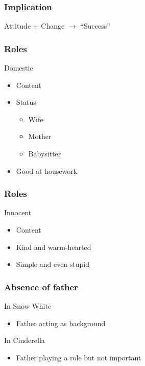 \documentclass{beamer}
\begin{document}
\begin{frame}
    \frametitle{Implication}
    \huge{Attitude + Change $\rightarrow$ ``Success''}
\end{frame}

\begin{frame}
    \frametitle{Roles}
    \Large
    \begin{block}{Domestic}
        \begin{itemize}
            \item Content
            \item Status
                  \begin{itemize}
                      \item Wife
                      \item Mother
                      \item Babysitter
                  \end{itemize}
            \item Good at housework
        \end{itemize}
    \end{block}
\end{frame}

\begin{frame}
    \frametitle{Roles}
    \Large
    \begin{block}{Innocent}
        \begin{itemize}
            \item Content
            \item Kind and warm-hearted
            \item Simple and even stupid
        \end{itemize}
    \end{block}
\end{frame}

\begin{frame}
    \frametitle{Absence of father}
    \begin{block}{In Snow White}
        \begin{itemize}
            \item Father acting as background
        \end{itemize}
    \end{block}
    \begin{block}{In Cinderella}
        \begin{itemize}
            \item Father playing a role but not important
        \end{itemize}
    \end{block}
\end{frame}
\end{document}
